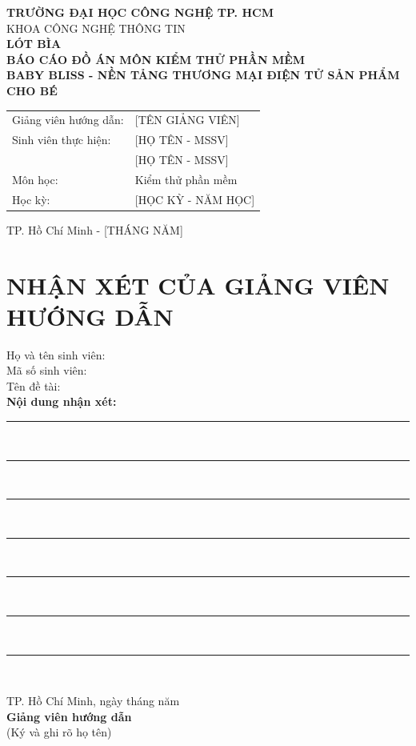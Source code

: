 \begin{titlepage}
	\begin{center}
		{\large \textbf{TRƯỜNG ĐẠI HỌC CÔNG NGHỆ TP. HCM}}\\[0.5cm]
		{\normalsize KHOA CÔNG NGHỆ THÔNG TIN}\\[2.0cm]

		{\Large \textbf{LÓT BÌA}}\\[1.2cm]
		{\large \textbf{BÁO CÁO ĐỒ ÁN MÔN KIỂM THỬ PHẦN MỀM}}\\[1.0cm]
		{\Large \textbf{BABY BLISS - NỀN TẢNG THƯƠNG MẠI ĐIỆN TỬ SẢN PHẨM CHO BÉ}}\\[1.5cm]

		\begin{tabular}{ll}
			Giảng viên hướng dẫn: & [TÊN GIẢNG VIÊN]   \\
			Sinh viên thực hiện:  & [HỌ TÊN - MSSV]    \\
			                      & [HỌ TÊN - MSSV]    \\
			Môn học:              & Kiểm thử phần mềm  \\
			Học kỳ:               & [HỌC KỲ - NĂM HỌC] \\
		\end{tabular}

		\vfill
		TP. Hồ Chí Minh - [THÁNG NĂM]
	\end{center}
\end{titlepage}

\newpage
{}
{}
\section*{\textbf{NHẬN XÉT CỦA GIẢNG VIÊN HƯỚNG DẪN}}

\vspace{0.5cm}
\noindent Họ và tên sinh viên: \dotfill\\[0.4cm]
\noindent Mã số sinh viên: \dotfill\\[0.4cm]
\noindent Tên đề tài: \dotfill\\[0.6cm]

\noindent \textbf{Nội dung nhận xét:}\\[0.4cm]
\noindent \rule{\textwidth}{0.4pt}\\[0.8cm]
\noindent \rule{\textwidth}{0.4pt}\\[0.8cm]
\noindent \rule{\textwidth}{0.4pt}\\[0.8cm]
\noindent \rule{\textwidth}{0.4pt}\\[0.8cm]
\noindent \rule{\textwidth}{0.4pt}\\[0.8cm]
\noindent \rule{\textwidth}{0.4pt}\\[0.8cm]
\noindent \rule{\textwidth}{0.4pt}\\[0.8cm]

\vfill
\begin{flushright}
	TP. Hồ Chí Minh, ngày \dotfill tháng \dotfill năm \dotfill\\[1.2cm]
	\textbf{Giảng viên hướng dẫn}\\[2.2cm]
	(Ký và ghi rõ họ tên)
\end{flushright}
